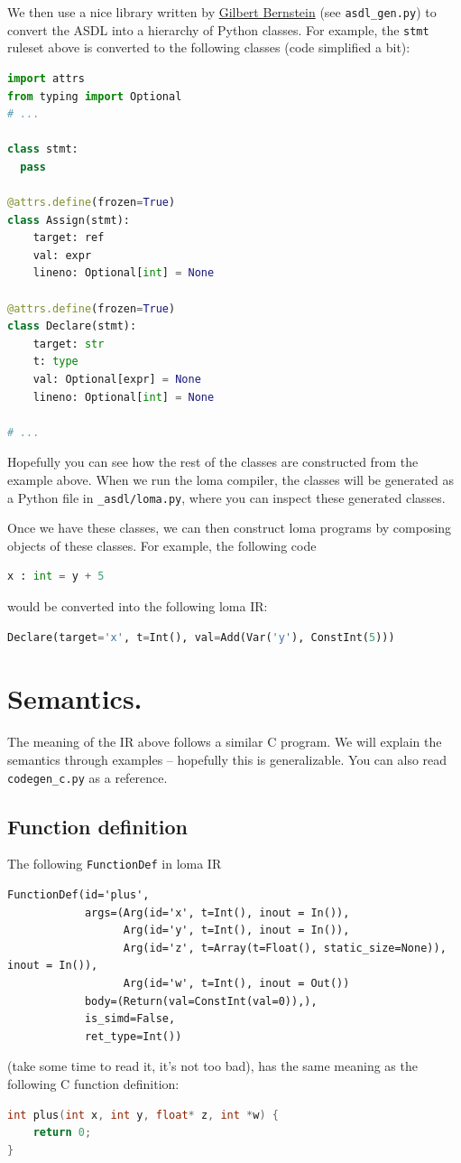 We then use a nice library written by \href{https://www.gilbertbernstein.com/}{Gilbert Bernstein} (see \lstinline{asdl_gen.py}) to convert the ASDL into a hierarchy of Python classes. For example, the \lstinline{stmt} ruleset above is converted to the following classes (code simplified a bit):
\begin{lstlisting}[language=python]
import attrs
from typing import Optional
# ...

class stmt:
  pass

@attrs.define(frozen=True)
class Assign(stmt):
    target: ref
    val: expr
    lineno: Optional[int] = None

@attrs.define(frozen=True)
class Declare(stmt):
    target: str
    t: type
    val: Optional[expr] = None
    lineno: Optional[int] = None

# ...
\end{lstlisting}
Hopefully you can see how the rest of the classes are constructed from the example above. When we run the loma compiler, the classes will be generated as a Python file in \lstinline{_asdl/loma.py}, where you can inspect these generated classes. 

Once we have these classes, we can then construct loma programs by composing objects of these classes. For example, the following code
\begin{lstlisting}[language=python]
x : int = y + 5
\end{lstlisting}
would be converted into the following loma IR:
\begin{lstlisting}[language=python]
Declare(target='x', t=Int(), val=Add(Var('y'), ConstInt(5)))
\end{lstlisting}

\section{Semantics.}
The meaning of the IR above follows a similar C program. We will explain the semantics through examples -- hopefully this is generalizable. You can also read \lstinline{codegen_c.py} as a reference.

\subsection{Function definition} 
The following \lstinline{FunctionDef} in loma IR
\begin{lstlisting}
FunctionDef(id='plus',
            args=(Arg(id='x', t=Int(), inout = In()),
                  Arg(id='y', t=Int(), inout = In()),
                  Arg(id='z', t=Array(t=Float(), static_size=None)), inout = In()),
                  Arg(id='w', t=Int(), inout = Out())
            body=(Return(val=ConstInt(val=0)),),
            is_simd=False,
            ret_type=Int())
\end{lstlisting}
(take some time to read it, it's not too bad), has the same meaning as the following C function definition:
\begin{lstlisting}[language=C]
int plus(int x, int y, float* z, int *w) {
    return 0;
}
\end{lstlisting}

